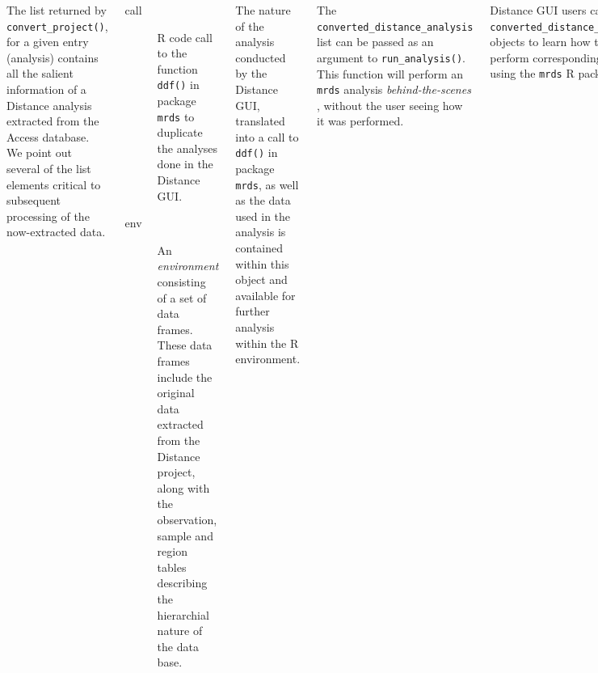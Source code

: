 \documentclass[14pt,a1paper,landscape]{tikzposter}
\begin{document}
\begin{columns}
{	The list returned by \texttt{convert\_project()}, for a given entry (analysis) contains all the salient information of a Distance analysis extracted from the Access database.  We point out several of the list elements critical to subsequent processing of the now-extracted data.
	\begin{description}
		\item [call] R code call to the function \texttt{ddf()} in package \texttt{mrds} to duplicate the analyses done in the Distance GUI.
		\item [env] An \textit{environment} consisting of a set of data frames.  These data frames include the original data extracted from the Distance project, along with the observation, sample and region tables describing the hierarchial nature of the data base.
	\end{description}

	The nature of the analysis conducted by the Distance GUI, translated into a call to \texttt{ddf()} in package \texttt{mrds}, as well as the data used in the analysis is contained within this object and available for further analysis within the R environment.
	
	The \texttt{converted\_distance\_analysis} list can be passed as an argument to \texttt{run\_analysis()}.  This function will perform an \texttt{mrds} analysis \emph{behind-the-scenes} , without the user seeing how it was performed.
} 


{
Distance GUI users can use \texttt{converted\_distance\_analysis} objects to learn how to perform corresponding analyses using the \texttt{mrds} R package:
	
    
}





\end{columns}
\end{document}
